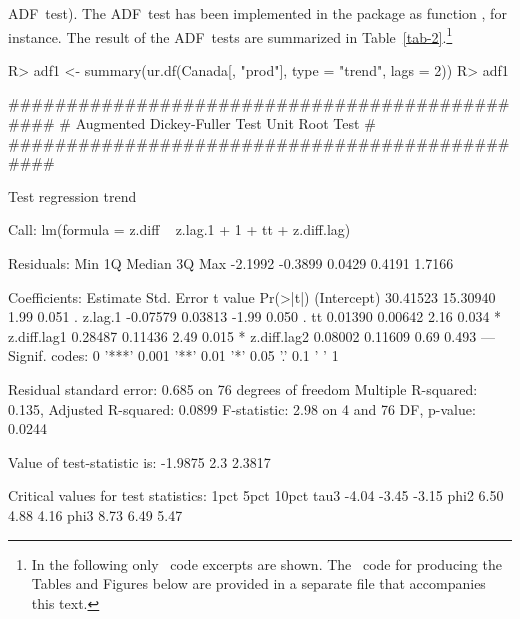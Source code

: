 \documentclass[nojss]{jss}
\begin{document}
ADF~test). The ADF~test has been implemented in the package  as
function , for instance. The result of the ADF~tests are
summarized in Table~\ref{tab-2}.\footnote{In the following only
  ~code excerpts are shown. The ~code for
  producing the Tables and Figures below are provided in a separate
  file that accompanies this text.}   
\begin{Schunk}
\begin{Sinput}
R> adf1 <- summary(ur.df(Canada[, "prod"], type = "trend", lags = 2))
R> adf1
\end{Sinput}
\begin{Soutput}
############################################### 
# Augmented Dickey-Fuller Test Unit Root Test # 
############################################### 

Test regression trend 


Call:
lm(formula = z.diff ~ z.lag.1 + 1 + tt + z.diff.lag)

Residuals:
    Min      1Q  Median      3Q     Max 
-2.1992 -0.3899  0.0429  0.4191  1.7166 

Coefficients:
            Estimate Std. Error t value Pr(>|t|)  
(Intercept) 30.41523   15.30940    1.99    0.051 .
z.lag.1     -0.07579    0.03813   -1.99    0.050 .
tt           0.01390    0.00642    2.16    0.034 *
z.diff.lag1  0.28487    0.11436    2.49    0.015 *
z.diff.lag2  0.08002    0.11609    0.69    0.493  
---
Signif. codes:  0 '***' 0.001 '**' 0.01 '*' 0.05 '.' 0.1 ' ' 1 

Residual standard error: 0.685 on 76 degrees of freedom
Multiple R-squared: 0.135,	Adjusted R-squared: 0.0899 
F-statistic: 2.98 on 4 and 76 DF,  p-value: 0.0244 


Value of test-statistic is: -1.9875 2.3 2.3817 

Critical values for test statistics: 
      1pct  5pct 10pct
tau3 -4.04 -3.45 -3.15
phi2  6.50  4.88  4.16
phi3  8.73  6.49  5.47
\end{Soutput}
\end{Schunk}
\end{document}
